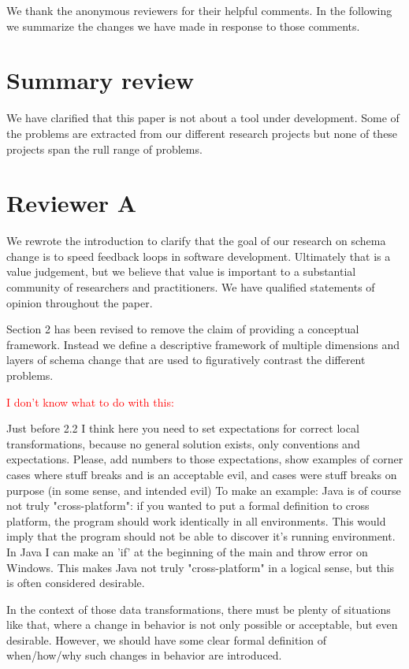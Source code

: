 \documentclass{article}
\begin{document}
We thank the anonymous reviewers for their helpful comments. In the following we summarize the changes we have made in response to those comments.

\section{Summary review}

We have clarified that this paper is not about a tool under development. Some of the problems are extracted from our different research projects but none of these projects span the rull range of problems.


\section{Reviewer A}

We rewrote the introduction to clarify that the goal of our research on schema change is to speed feedback loops in software development. Ultimately that is a value judgement, but we believe that value is important to a substantial community of researchers and practitioners. We have qualified statements of opinion throughout the paper.

Section 2 has been revised to remove the claim of providing a conceptual framework. Instead we define a descriptive framework of multiple dimensions and layers of schema change that are used to figuratively contrast the different problems.

\textcolor{red}{I don't know what to do with this:}
\begin{displayquote}
  Just before 2.2 I think here you need to set expectations for correct local transformations, because no general solution exists, only conventions and expectations. Please, add numbers to those expectations, show examples of corner cases where stuff breaks and is an acceptable evil, and cases were stuff breaks on purpose (in some sense, and intended evil) To make an example: Java is of course not truly "cross-platform": if you wanted to put a formal definition to cross platform, the program should work identically in all environments. This would imply that the program should not be able to discover it's running environment. In Java I can make an 'if' at the beginning of the main and throw error on Windows. This makes Java not truly "cross-platform" in a logical sense, but this is often considered desirable.

  In the context of those data transformations, there must be plenty of situations like that, where a change in behavior is not only possible or acceptable, but even desirable. However, we should have some clear formal definition of when/how/why such changes in behavior are introduced.
\end{displayquote}
\end{document}
